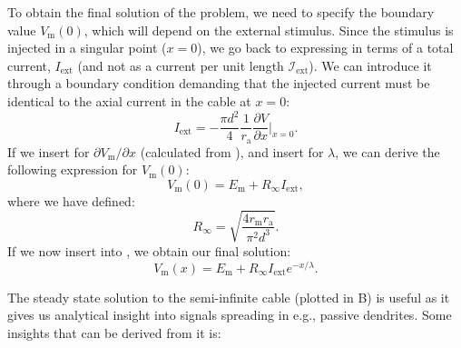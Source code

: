 To obtain the final solution of the problem, we need to specify the boundary value $V_\mathrm{m}(0)$, which will depend on the external stimulus. Since the stimulus is injected in a singular point ($x=0$), we go back to expressing in terms of a total current, $I_\text{ext}$ (and not as a current per unit length $\mathcal{I}_\text{ext}$). 
We can introduce it through a boundary condition demanding that the injected current must be identical to the axial current in the cable at $x=0$:
\begin{equation}
I_\text{ext} = - \frac{\pi d^2}{4}\frac{1}{r_\text{a}} \frac{\partial V}{\partial x}   \Big|_{x=0}.
\end{equation}
If we insert for $\partial V_\mathrm{m}/\partial x$ (calculated from ), and insert  for $\lambda$, we can derive the following expression for $V_\mathrm{m}(0)$:
\begin{equation}
V_\mathrm{m}(0) = E_\mathrm{m} + R_{\infty}I_\text{ext}, 
\label{eq:Neuron:firstRinf}
\end{equation}
where we have defined:
\begin{equation}
R_{\infty} = \sqrt{\frac{4 r_\text{m} r_\text{a}}{\pi^2 d^3}}.
\label{eq:Neuron:Rinf}
\end{equation}
If we now insert  into , we obtain our final solution:
\begin{equation}
V_\mathrm{m}(x) = E_\mathrm{m}+R_{\infty}I_\text{ext}  e^{-x/\lambda}.
\label{eq:Neuron:semiinf5}
\end{equation}

The steady state solution to the semi-infinite cable (plotted in B) is useful as it gives us analytical insight into signals spreading in e.g., passive dendrites. Some insights that can be derived from it is:

